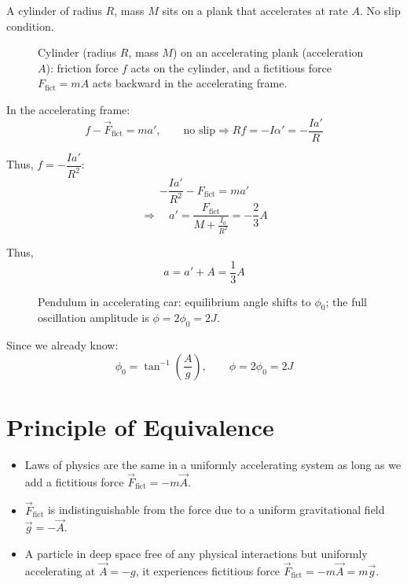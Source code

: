 \begin{example}
A cylinder of radius $R$, mass $M$ sits on a plank that accelerates at rate $A$. No slip condition.

\begin{figure}[H]
  \centering
  \caption{Cylinder (radius $R$, mass $M$) on an accelerating plank (acceleration $A$): friction force $f$ acts on the cylinder, and a fictitious force $F_\text{fict} = mA$ acts backward in the accelerating frame.}
\end{figure}

In the accelerating frame:
\[
  f - \vec{F}_\text{fict} = ma', \qquad \text{no slip} \Rightarrow Rf = -I\alpha' = -\frac{Ia'}{R}
\]

Thus, $f = -\dfrac{Ia'}{R^2}$:
\[
  -\frac{Ia'}{R^2} - F_\text{fict} = ma'
\]
\[
  \Rightarrow \quad a' = \frac{F_\text{fict}}{M + \frac{I_0}{R^2}} = -\frac{2}{3}A
\]

Thus,
\[
  a = a' + A = \boxed{\frac{1}{3}A}
\]
\end{example}

\begin{example}
\begin{figure}[H]
  \centering
  \caption{Pendulum in accelerating car: equilibrium angle shifts to $\phi_0$; the full oscillation amplitude is $\phi = 2\phi_0 = 2J$.}
\end{figure}

Since we already know:
\[
  \phi_0 = \tan^{-1}\!\left(\frac{A}{g}\right), \qquad \phi = 2\phi_0 = 2J
\]
\end{example}

\section{Principle of Equivalence}

\begin{itemize}
  \item Laws of physics are the same in a uniformly accelerating system as long as we add a fictitious force $\vec{F}_\text{fict} = -m\vec{A}$.
  \item $\vec{F}_\text{fict}$ is indistinguishable from the force due to a uniform gravitational field $\vec{g} = -\vec{A}$.
  \item A particle in deep space free of any physical interactions but uniformly accelerating at $\vec{A} = -g$, it experiences fictitious force $\vec{F}_\text{fict} = -m\vec{A} = m\vec{g}$.
\end{itemize}

